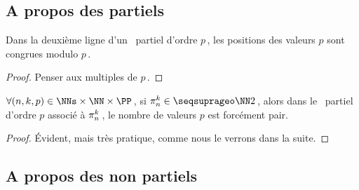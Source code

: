 

\subsection{A propos des \sftab[x] partiels} \label{sftable-constraint}


\begin{fact} \label{sftable-multiple}

	Dans la deuxième ligne d'un \sftab\ partiel d'ordre $p$\,, les positions des valeurs $p$ sont congrues modulo $p$\,.
\end{fact}


\begin{proof}
	Penser aux multiples de $p$\,.
\end{proof}




\begin{fact} \label{sftable-parity-square}
	$\forall (n, k, p) \in \NNs \times \NN \times \PP$\,,
	si $\consprod \in \NNsquare$\,,
	alors dans le \sftab\ partiel d'ordre $p$ associé à $\consprod$\,, le nombre de valeurs $p$ est forcément pair.
\end{fact}


\begin{proof}
	Évident, mais très pratique, comme nous le verrons dans la suite.
\end{proof}




\subsection{A propos des \sftab[x] non partiels} \label{sftab-illegal}


